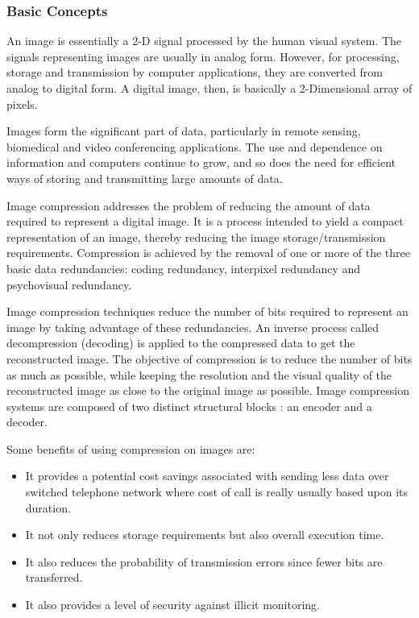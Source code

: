 \subsubsection{Basic Concepts}
An image is essentially a 2-D signal processed by the human visual system. The signals representing images are usually in analog form. However, for processing, storage and transmission by computer applications, they are converted from analog to digital form. A digital image, then, is basically a 2-Dimensional array of pixels.

Images form the significant part of data, particularly in remote sensing, biomedical and video conferencing applications. The use and dependence on information and computers continue to grow, and so does the need for efficient ways of storing and transmitting large amounts of data.

Image compression addresses the problem of reducing the amount of data required to represent a digital image. It is a process intended to yield a compact representation of an image, thereby reducing the image storage/transmission requirements. Compression is achieved by the removal of one or more of the three basic data redundancies: coding redundancy, interpixel redundancy and psychovisual redundancy\cite{Kumar:2007}.

Image compression techniques reduce the number of bits required to represent an image by taking advantage of these redundancies. An inverse process called decompression (decoding) is applied to the compressed data to get the reconstructed image. The objective of compression is to reduce the number of bits as much as possible, while keeping the resolution and the visual quality of the reconstructed image as close to the original image as possible. Image compression systems are composed of two distinct structural blocks : an encoder and a decoder.

Some benefits of using compression on images are:
\begin{itemize}
\item It provides a potential cost savings associated with sending less data over switched telephone network
where cost of call is really usually based upon its duration.
\item It not only reduces storage requirements but also overall execution time.
\item It also reduces the probability of transmission errors since fewer bits are transferred.
\item It also provides a level of security against illicit monitoring.
\end{itemize}

